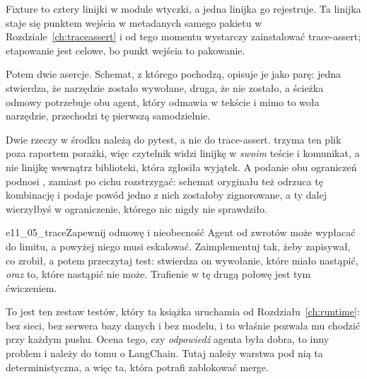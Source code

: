 \noindent
Fixture to cztery linijki w module wtyczki, a jedna linijka
 go rejestruje. Ta linijka staje się punktem wejścia w
metadanych samego pakietu w Rozdziale~\ref{ch:traceassert} i od tego
momentu wystarczy zainstalować trace-assert; etapowanie jest celowe, bo
punkt wejścia to pakowanie.


\noindent
Potem dwie asercje. Schemat, z którego pochodzą, opisuje je jako parę: jedna
stwierdza, że narzędzie zostało wywołane, druga, że nie zostało, a ścieżka
odmowy potrzebuje obu \dash{} agent, który odmawia w tekście i mimo to woła
narzędzie, przechodzi tę pierwszą samodzielnie.


\noindent
Dwie rzeczy w środku należą do pytest, a nie do trace-assert.  trzyma ten plik poza raportem porażki, więc czytelnik
widzi linijkę w \emph{swoim} teście i komunikat, a nie linijkę wewnątrz
biblioteki, która zgłosiła wyjątek. A podanie obu ograniczeń podnosi
, zamiast po cichu rozstrzygać: schemat oryginału też
odrzuca tę kombinację i podaje powód \dash{} jedno z nich zostałoby
zignorowane, a ty dalej wierzyłbyś w ograniczenie, którego nic nigdy nie
sprawdziło.

\begin{exercise}{e11_05_trace}{Zapewnij odmowę i nieobecność}
Agent od zwrotów może wypłacać do limitu, a powyżej niego musi eskalować.
Zaimplementuj  tak, żeby zapisywał, co zrobił, a potem
przeczytaj test: stwierdza on wywołanie, które miało nastąpić, \emph{oraz}
to, które nastąpić nie może. Trafienie w tę drugą połowę jest tym
ćwiczeniem.
\end{exercise}

\noindent
To jest ten zestaw testów, który ta książka uruchamia od
Rozdziału~\ref{ch:runtime}: bez sieci, bez serwera bazy danych i bez modelu,
i to właśnie pozwala mu chodzić przy każdym pushu. Ocena tego, czy
\emph{odpowiedź} agenta była dobra, to inny problem i należy do tomu o
LangChain. Tutaj należy warstwa pod nią \dash{} ta deterministyczna, a więc
ta, która potrafi zablokować merge.
